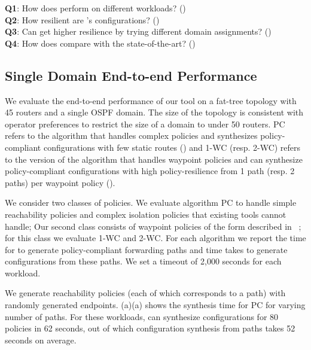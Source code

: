 \vspace{2mm}
\noindent\textbf{Q1}: How does \name perform on different  workloads? ()\\
\noindent\textbf{Q2}: How resilient are \name's  configurations? ()\\
\noindent\textbf{Q3}: Can \name get higher resilience by trying different domain assignments? ()\\
\noindent\textbf{Q4}: How does \name compare with the state-of-the-art? ()



\subsection{Single Domain End-to-end Performance}\label{sec:ospfeval}


We evaluate the end-to-end performance of our tool
on a  fat-tree 
topology with 45 routers
and a single OSPF domain. 
The size of the topology is consistent with operator preferences to restrict
the size of a domain to under 50 routers.
PC refers to the algorithm that handles complex policies and
synthesizes policy-compliant
configurations with few static routes ()
and 
1-WC (resp. 2-WC) refers to the version of the algorithm that handles waypoint policies and
can synthesize policy-compliant
configurations with high policy-resilience from 1 path (resp. 2 paths) per waypoint policy ().

We consider two classes of policies. 
We evaluate algorithm PC to handle simple
reachability policies and complex isolation policies that 
existing tools cannot handle; 
Our second class consists of
 waypoint policies of the form described in ~;
for this class we evaluate 1-WC and 2-WC.
For each algorithm we report the time for 
\genesis to generate policy-compliant forwarding paths
and time \name takes to generate configurations 
from these paths. We set a timeout of 2,000 seconds for each workload.

We generate reachability policies (each of which 
corresponds to a path) with randomly generated endpoints.
(a)(a) shows the synthesis time for
PC for varying number of paths. 
For these workloads, \name can
synthesize configurations for 80 policies in 62 
seconds, out of which configuration synthesis from paths 
takes 52 seconds on average.

